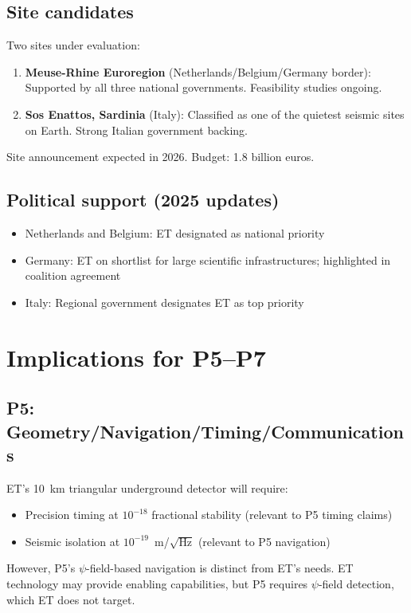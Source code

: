 \documentclass[11pt,a4paper]{article}
\begin{document}
\subsection{Site candidates}

Two sites under evaluation:
\begin{enumerate}
\item \textbf{Meuse-Rhine Euroregion} (Netherlands/Belgium/Germany border): Supported by all three national governments. Feasibility studies ongoing.
\item \textbf{Sos Enattos, Sardinia} (Italy): Classified as one of the quietest seismic sites on Earth. Strong Italian government backing.
\end{enumerate}

Site announcement expected in 2026. Budget: 1.8 billion euros.

\subsection{Political support (2025 updates)}

\begin{itemize}
\item Netherlands and Belgium: ET designated as national priority
\item Germany: ET on shortlist for large scientific infrastructures; highlighted in coalition agreement
\item Italy: Regional government designates ET as top priority
\end{itemize}

\section{Implications for P5--P7}

\subsection{P5: Geometry/Navigation/Timing/Communications}

ET's 10~km triangular underground detector will require:
\begin{itemize}
\item Precision timing at $10^{-18}$ fractional stability (relevant to P5 timing claims)
\item Seismic isolation at $10^{-19}$~m/$\sqrt{\text{Hz}}$ (relevant to P5 navigation)
\end{itemize}

However, P5's $\psi$-field-based navigation is distinct from ET's needs. ET technology may provide enabling capabilities, but P5 requires $\psi$-field detection, which ET does not target.
\end{document}
